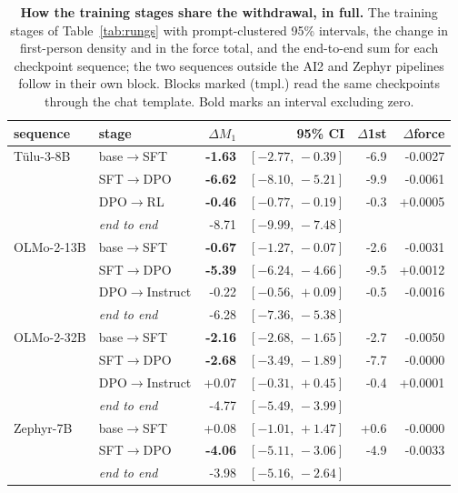 \begin{table}[tb]
\centering\small
\caption{\textbf{How the training stages share the withdrawal, in full.} The training stages of Table~\ref{tab:rungs} with prompt-clustered 95\% intervals, the change in first-person density and in the force total, and the end-to-end sum for each checkpoint sequence; the two sequences outside the AI2 and Zephyr pipelines follow in their own block. Blocks marked (tmpl.) read the same checkpoints through the chat template. Bold marks an interval excluding zero.}
\label{tab:rungs-full}
\begin{tabular}{llrrrr}
\toprule
sequence & stage & $\Delta M_1$ & 95\% CI & $\Delta$1st & $\Delta$force \\
\midrule
Tülu-3-8B    & base$\rightarrow$SFT & \textbf{-1.63} & $[-2.77,\,-0.39]$ & -6.9 & -0.0027 \\
             & SFT$\rightarrow$DPO & \textbf{-6.62} & $[-8.10,\,-5.21]$ & -9.9 & -0.0061 \\
             & DPO$\rightarrow$RL & \textbf{-0.46} & $[-0.77,\,-0.19]$ & -0.3 & +0.0005 \\
 & \emph{end to end} & -8.71 & $[-9.99,\,-7.48]$ & & \\
\addlinespace
OLMo-2-13B   & base$\rightarrow$SFT & \textbf{-0.67} & $[-1.27,\,-0.07]$ & -2.6 & -0.0031 \\
             & SFT$\rightarrow$DPO & \textbf{-5.39} & $[-6.24,\,-4.66]$ & -9.5 & +0.0012 \\
             & DPO$\rightarrow$Instruct & -0.22 & $[-0.56,\,+0.09]$ & -0.5 & -0.0016 \\
 & \emph{end to end} & -6.28 & $[-7.36,\,-5.38]$ & & \\
\addlinespace
OLMo-2-32B   & base$\rightarrow$SFT & \textbf{-2.16} & $[-2.68,\,-1.65]$ & -2.7 & -0.0050 \\
             & SFT$\rightarrow$DPO & \textbf{-2.68} & $[-3.49,\,-1.89]$ & -7.7 & -0.0000 \\
             & DPO$\rightarrow$Instruct & +0.07 & $[-0.31,\,+0.45]$ & -0.4 & +0.0001 \\
 & \emph{end to end} & -4.77 & $[-5.49,\,-3.99]$ & & \\
\addlinespace
Zephyr-7B    & base$\rightarrow$SFT & +0.08 & $[-1.01,\,+1.47]$ & +0.6 & -0.0000 \\
             & SFT$\rightarrow$DPO & \textbf{-4.06} & $[-5.11,\,-3.06]$ & -4.9 & -0.0033 \\
 & \emph{end to end} & -3.98 & $[-5.16,\,-2.64]$ & & \\

\end{tabular}
\end{table}
